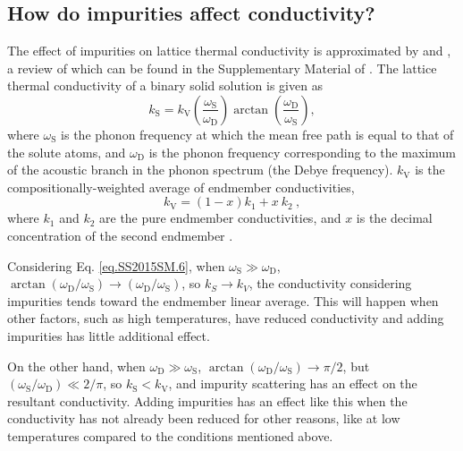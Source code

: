 \subsection{How do impurities affect conductivity?} 
\label{impur_theory}

The effect of impurities on lattice thermal conductivity is approximated by \citet{Klemens1960} and \citet{Padture1997}, a review of which can be found in the Supplementary Material of \citet{Stackhouse2015}. The lattice thermal conductivity of a binary solid solution is given \citep[in][Eq. S6]{Stackhouse2015} as
%
\begin{equation}
k_{\mathrm{S}}=k_{\mathrm{V}}\left ( \frac{\omega_{\mathrm{S}}}{\omega_{\mathrm{D}}} \right )\arctan \left ( \frac{\omega_{\mathrm{D}}}{\omega_{\mathrm{S}}} \right ),
\label{eq.SS2015SM.6}
\end{equation}
%
where $\omega_{\mathrm{S}}$ is the phonon frequency at which the mean free path is equal to that of the solute atoms, and $\omega_{\mathrm{D}}$ is the phonon frequency corresponding to the maximum of the acoustic branch in the phonon spectrum (the Debye frequency). $k_{\mathrm{V}}$ is the compositionally-weighted average of endmember conductivities, 
%
\begin{equation}
k_{\mathrm{V}}=\left ( 1-x \right )k_{1} + x\ k_{2} \ ,
\label{eq.SS2015SM.7}
\end{equation}
%
where $k_{\mathrm{1}}$ and $k_{\mathrm{2}}$ are the pure endmember conductivities, and $x$ is the decimal concentration of the second endmember \citep[][Eq. S7]{Stackhouse2015}.

Considering Eq. \ref{eq.SS2015SM.6}, when $\omega_{\mathrm{S}} \gg \omega_{\mathrm{D}}$, $\arctan(\omega_{\mathrm{D}}/\omega_{\mathrm{S}}) \rightarrow (\omega_{\mathrm{D}}/\omega_{\mathrm{S}})$, so $k_{S} \rightarrow k_{V}$, the conductivity considering impurities tends toward the endmember linear average. This will happen when other factors, such as high temperatures, have reduced conductivity and adding impurities has little additional effect.

On the other hand, when $\omega_{\mathrm{D}}\gg\omega_{\mathrm{S}}$, $\arctan(\omega_{\mathrm{D}}/\omega_{\mathrm{S}})\rightarrow\pi/2$, but $(\omega_{\mathrm{S}}/\omega_{\mathrm{D}})\ll 2/\pi$, so $k_{\mathrm{S}} < k_{\mathrm{V}}$, and impurity scattering has an effect on the resultant conductivity. Adding impurities has an effect like this when the conductivity has not already been reduced for other reasons, like at low temperatures compared to the conditions mentioned above. 

